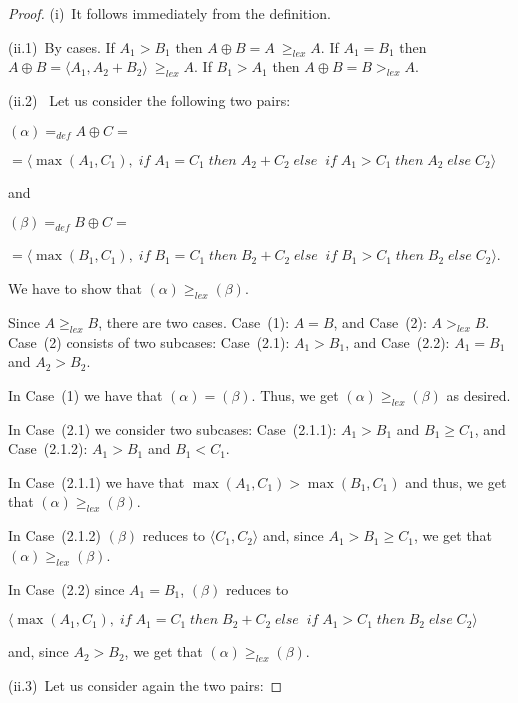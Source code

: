 \documentclass[english]{tlp}
\newcommand{\gel}{\geq_{\mathit{lex}}}
\newcommand{\gl}{>_{\mathit{lex}}}
\newcommand{\bif}{\;{\mathit{if}}\;}
\newcommand{\bth}{\;{\mathit{then}}\;}
\newcommand{\bel}{\;{\mathit{else}}\;}
\renewcommand{\mathit}{\displaystyle}
\begin{document}
\begin{proof} (i)~It follows immediately from the definition.

\smallskip
\noindent(ii.1)~By cases. If $A_1>B_1$ then $A \oplus B =
A\ \geq_{\mathit{lex}}A$. If $A_1=B_1$ then $A \oplus B  =
\langle A_1,A_2+B_2\rangle\ \geq_{\mathit{lex}}A$. If
$B_1>A_1$ then $A \oplus B = B >_{\mathit{lex}}A$.


\medskip
\noindent(ii.2)~
Let us consider the following two pairs:

$(\alpha)=_{\mathit{def}}A\oplus C=$

$= \langle \max(A_1,C_1), \bif A_1\!=\!C_1\bth A_2\!+\!C_2 
\bel \! \bif A_1\!>\!C_1 \bth A_2 \bel C_2\rangle$ 

\noindent
and 

$(\beta)=_{\mathit{def}}B\oplus C =$

$= \langle \max(B_1,C_1),
 \bif B_1\!=\!C_1\bth B_2\!+\!C_2 
\bel \! \bif B_1\!>\!C_1 \bth B_2 \bel C_2\rangle$.

\noindent 
We have to show that $(\alpha)\gel (\beta)$.

\noindent 
Since $A\gel B$, there are two cases. Case~(1): $A=B$,  and  
Case~(2): $A\gl B$. Case~(2) consists of two subcases:
Case~(2.1): $A_1>B_1$,  and Case~(2.2): $A_1=B_1$  and $A_2>B_2$.


\noindent
In Case~(1) we have that $(\alpha)= (\beta)$. Thus, we get $(\alpha)\gel (\beta)$ as desired.

\noindent
In Case~(2.1) we consider two subcases: Case~(2.1.1): $A_1>B_1$
and $B_1\geq C_1$, and Case~(2.1.2): $A_1>B_1$
and $B_1< C_1$.

\noindent
In Case~(2.1.1) we have that $\max(A_1,C_1)>\max(B_1,C_1)$ and thus, 
we get that $(\alpha)\gel (\beta)$.

\noindent
In Case~(2.1.2) $(\beta)$ reduces to $\langle C_1,  C_2\rangle$
and, since $A_1>B_1\geq C_1$,  we get that $(\alpha)\gel (\beta)$.

\noindent
In Case~(2.2) since $A_1=B_1$, $(\beta)$ reduces to

$\langle \max(A_1,C_1), \bif A_1=C_1\bth B_2\!+\!C_2 
\bel \! \bif A_1>C_1 \bth B_2 \bel C_2\rangle$

\noindent
and, since $A_2>B_2$, we get that $(\alpha)\gel (\beta)$.










\medskip
\noindent(ii.3)~Let us consider again the two pairs:


\end{proof}
\end{document}
